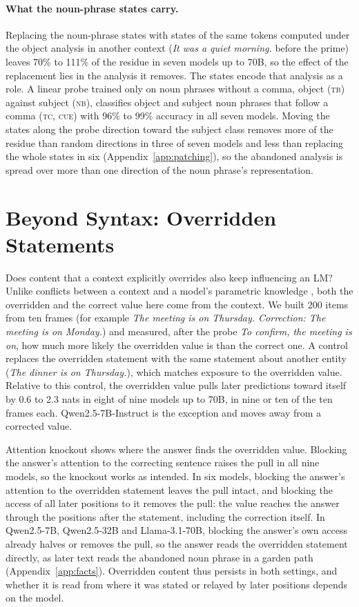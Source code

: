 \documentclass[11pt]{article}
\newcommand{\ex}[1]{\textit{#1}}
\newcommand{\cond}[1]{\textsc{#1}}
\begin{document}
\paragraph{What the noun-phrase states carry.}
Replacing the noun-phrase states with states of the same tokens computed under the object analysis in another context (\ex{It was a quiet morning.} before the prime) leaves 70\% to 111\% of the residue in seven models up to 70B, so the effect of the replacement lies in the analysis it removes.
The states encode that analysis as a role.
A linear probe trained only on noun phrases without a comma, object (\cond{tb}) against subject (\cond{nb}), classifies object and subject noun phrases that follow a comma (\cond{tc}, \cond{cue}) with 96\% to 99\% accuracy in all seven models.
Moving the states along the probe direction toward the subject class removes more of the residue than random directions in three of seven models and less than replacing the whole states in six (Appendix~\ref{app:patching}), so the abandoned analysis is spread over more than one direction of the noun phrase's representation.

\section{Beyond Syntax: Overridden Statements}
\label{sec:facts}

Does content that a context explicitly overrides also keep influencing an LM?
Unlike conflicts between a context and a model's parametric knowledge \citep{longpre2021,xie2024conflict}, both the overridden and the correct value here come from the context.
We built 200 items from ten frames (for example \ex{The meeting is on Thursday. Correction: The meeting is on Monday.}) and measured, after the probe \ex{To confirm, the meeting is on}, how much more likely the overridden value is than the correct one.
A control replaces the overridden statement with the same statement about another entity (\ex{The dinner is on Thursday.}), which matches exposure to the overridden value.
Relative to this control, the overridden value pulls later predictions toward itself by 0.6 to 2.3 nats in eight of nine models up to 70B, in nine or ten of the ten frames each.
Qwen2.5-7B-Instruct is the exception and moves away from a corrected value.

Attention knockout shows where the answer finds the overridden value.
Blocking the answer's attention to the correcting sentence raises the pull in all nine models, so the knockout works as intended.
In six models, blocking the answer's attention to the overridden statement leaves the pull intact, and blocking the access of all later positions to it removes the pull: the value reaches the answer through the positions after the statement, including the correction itself.
In Qwen2.5-7B, Qwen2.5-32B and Llama-3.1-70B, blocking the answer's own access already halves or removes the pull, so the answer reads the overridden statement directly, as later text reads the abandoned noun phrase in a garden path (Appendix~\ref{app:facts}).
Overridden content thus persists in both settings, and whether it is read from where it was stated or relayed by later positions depends on the model.
\end{document}

